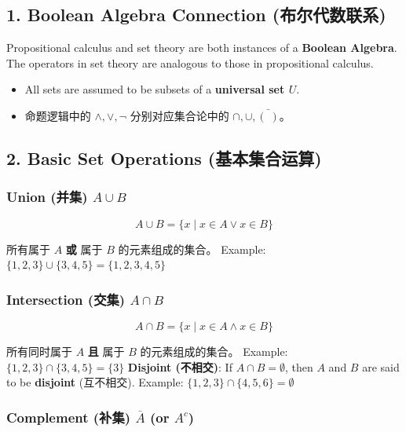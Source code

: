 \documentclass[10pt,a4paper,openany]{ctexbook}
\theoremstyle{definition}
\theoremstyle{remark}
\begin{document}
\vspace{-2pt}

\subsection{1. Boolean Algebra Connection (布尔代数联系)}

Propositional calculus and set theory are both instances of a \textbf{Boolean Algebra}. The operators in set theory are analogous to those in propositional calculus.
\begin{itemize}
\item All sets are assumed to be subsets of a \textbf{universal set $U$}.
\item 命题逻辑中的 $\land, \lor, \lnot$ 分别对应集合论中的 $\cap, \cup, \bar{(\;)}$。

\end{itemize}

\vspace{-2pt}

\subsection{2. Basic Set Operations (基本集合运算)}

\subsubsection{Union (并集) $A \cup B$}

\[
A \cup B = \{x \mid x \in A \lor x \in B\}
\]

所有属于 $A$ \textbf{或} 属于 $B$ 的元素组成的集合。
Example: $\{1,2,3\} \cup \{3,4,5\} = \{1,2,3,4,5\}$
\subsubsection{Intersection (交集) $A \cap B$}

\[
A \cap B = \{x \mid x \in A \land x \in B\}
\]

所有同时属于 $A$ \textbf{且} 属于 $B$ 的元素组成的集合。
Example: $\{1,2,3\} \cap \{3,4,5\} = \{3\}$
\textbf{Disjoint (不相交)}: If $A \cap B = \emptyset$, then $A$ and $B$ are said to be \textbf{disjoint} (互不相交).
Example: $\{1,2,3\} \cap \{4,5,6\} = \emptyset$
\subsubsection{Complement (补集) $\overline{A}$ (or $A^c$)}
\end{document}
